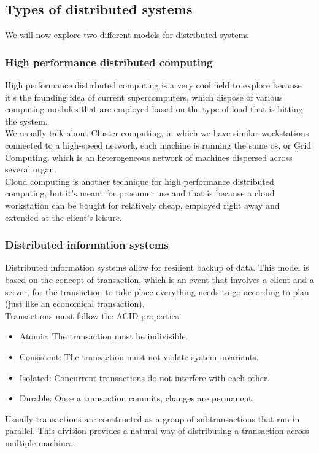 \subsection{Types of distributed systems}
We will now explore two different models for distributed systems.
\subsubsection{High performance distributed computing}
High performance distirbuted computing is a very cool field to explore because it's the founding idea of current supercomputers, which dispose of various computing modules that are employed based on the type of load that is hitting the system. \\
We usually talk about Cluster computing, in which we have similar workstations connected to a high-speed network, each machine is running the same os, or Grid Computing, which is an heterogeneous network of machines dispersed across several organ. \\
Cloud computing is another technique for high performance distributed computing, but it's meant for prosumer use and that is because a cloud workstation can be bought for relatively cheap, employed right away and extended at the client's leisure.
\subsubsection{Distributed information systems}
Distributed information systems allow for resilient backup of data. This model is based on the concept of transaction, which is an event that involves a client and a server, for the transaction to take place everything needs to go according to plan (just like an economical transaction). \\
Transactions must follow the ACID properties:
\begin{itemize}
    \item Atomic: The transaction must be indivisible.
    \item Consistent: The transaction must not violate system invariants.
    \item Isolated: Concurrent transactions do not interfere with each other.
    \item Durable: Once a transaction commits, changes are permanent.
\end{itemize}
Usually transactions are constructed as a group of subtransactions that run in parallel. This division provides a natural way of distributing a transaction across multiple machines.
